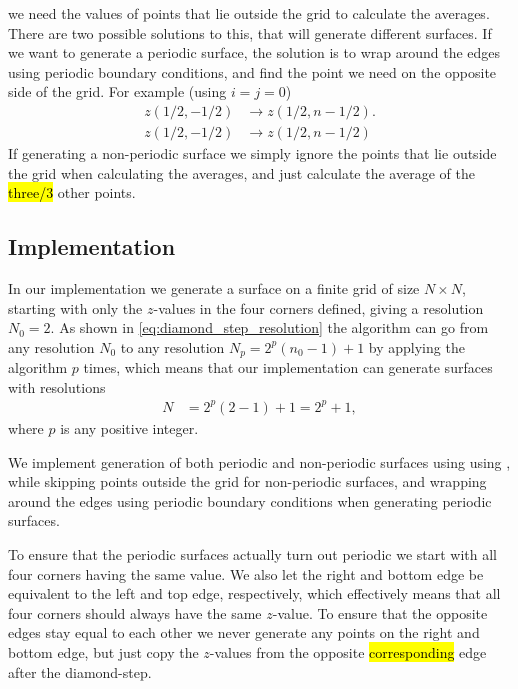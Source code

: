 we need the values of points that lie outside the grid to calculate the averages. There are two possible solutions to this, that will generate different surfaces. If  we want to generate a periodic surface, the solution is to wrap around the edges using periodic boundary conditions, and find the point we need on the opposite side of the grid. For example (using $i = j = 0$)
\begin{align*}
    z(1/2, -1/2) &\rightarrow z(1/2, n-1/2). \\
    z(1/2, -1/2) &\rightarrow z(1/2, n-1/2)
\end{align*}
If generating a non-periodic surface we simply ignore the points that lie outside the grid when calculating the averages, and just calculate the average of the \hl{three/3} other points.

\subsection{Implementation\label{subsec:SRA_implementation}}
In our implementation we generate a surface on a finite grid of size $N\times N$, starting with only the $z$-values in the four corners defined, giving a resolution $N_0 = 2$. As shown in \cref{eq:diamond_step_resolution} the algorithm can go from any resolution $N_0$ to any resolution $N_p = 2^p(n_0-1) + 1$ by applying the algorithm $p$ times, which means that our implementation can generate surfaces with resolutions
\begin{align*}
    N &= 2^p(2-1) + 1 = 2^p + 1,
\end{align*}
where $p$ is any positive integer.

We implement generation of both periodic and non-periodic surfaces using using , while skipping points outside the grid for non-periodic surfaces, and wrapping around the edges using periodic boundary conditions when generating periodic surfaces.

To ensure that the periodic surfaces actually turn out periodic we start with all four corners having the same value. We also let the right and bottom edge be equivalent to the left and top edge, respectively, which effectively means that all four corners should always have the same $z$-value. To ensure that the opposite edges stay equal to each other we never generate any points on the right and bottom edge, but just copy the $z$-values from the opposite \hl{corresponding} edge after the diamond-step.

